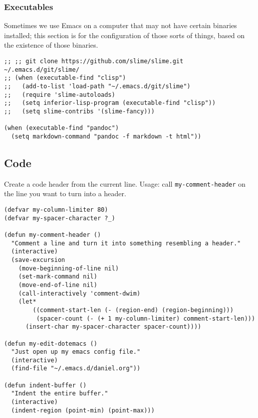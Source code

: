 \documentclass[11pt]{article}
\begin{document}
\subsubsection{Executables}
\label{sec-1-2-6}

Sometimes we use Emacs on a computer that may not have certain binaries installed;
this section is for the configuration of those sorts of things, based on the existence
of those binaries.

\begin{verbatim}
;; ;; git clone https://github.com/slime/slime.git ~/.emacs.d/git/slime/
;; (when (executable-find "clisp")
;;   (add-to-list 'load-path "~/.emacs.d/git/slime")
;;   (require 'slime-autoloads)
;;   (setq inferior-lisp-program (executable-find "clisp"))
;;   (setq slime-contribs '(slime-fancy)))

(when (executable-find "pandoc")
  (setq markdown-command "pandoc -f markdown -t html"))
\end{verbatim}

\subsection{Code}
\label{sec-1-3}

Create a code header from the current line. Usage: call \texttt{my-comment-header} on the line you want
to turn into a header.

\begin{verbatim}
(defvar my-column-limiter 80)
(defvar my-spacer-character ?_)

(defun my-comment-header ()
  "Comment a line and turn it into something resembling a header."
  (interactive)
  (save-excursion
    (move-beginning-of-line nil)
    (set-mark-command nil)
    (move-end-of-line nil)
    (call-interactively 'comment-dwim)
    (let*
        ((comment-start-len (- (region-end) (region-beginning)))
         (spacer-count (- (+ 1 my-column-limiter) comment-start-len)))
      (insert-char my-spacer-character spacer-count))))

(defun my-edit-dotemacs ()
  "Just open up my emacs config file."
  (interactive)
  (find-file "~/.emacs.d/daniel.org"))

(defun indent-buffer ()
  "Indent the entire buffer."
  (interactive)
  (indent-region (point-min) (point-max)))
\end{verbatim}
\end{document}

